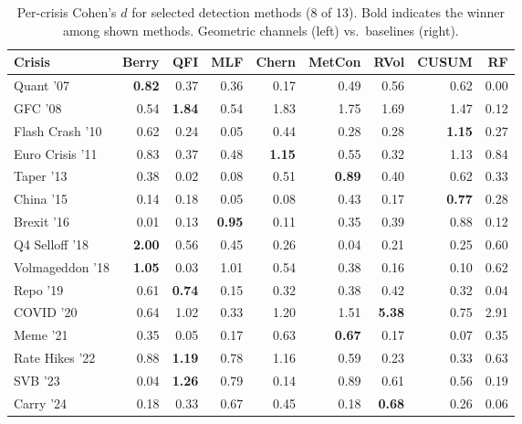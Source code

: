 \begin{table}[htbp]
\centering
\caption{Per-crisis Cohen's $d$ for selected detection methods (8 of 13).
  Bold indicates the winner among shown methods.  Geometric channels (left) vs.\ baselines (right).}
\label{tab:per_crisis_winners}
\footnotesize
\setlength{\tabcolsep}{3pt}
\begin{tabular}{lrrrrrrrr}
\toprule
Crisis & Berry & QFI & MLF & Chern & MetCon & RVol & CUSUM & RF \\
\midrule
Quant '07 & \textbf{0.82} & 0.37 & 0.36 & 0.17 & 0.49 & 0.56 & 0.62 & 0.00 \\
GFC '08 & 0.54 & \textbf{1.84} & 0.54 & 1.83 & 1.75 & 1.69 & 1.47 & 0.12 \\
Flash Crash '10 & 0.62 & 0.24 & 0.05 & 0.44 & 0.28 & 0.28 & \textbf{1.15} & 0.27 \\
Euro Crisis '11 & 0.83 & 0.37 & 0.48 & \textbf{1.15} & 0.55 & 0.32 & 1.13 & 0.84 \\
Taper '13 & 0.38 & 0.02 & 0.08 & 0.51 & \textbf{0.89} & 0.40 & 0.62 & 0.33 \\
China '15 & 0.14 & 0.18 & 0.05 & 0.08 & 0.43 & 0.17 & \textbf{0.77} & 0.28 \\
Brexit '16 & 0.01 & 0.13 & \textbf{0.95} & 0.11 & 0.35 & 0.39 & 0.88 & 0.12 \\
Q4 Selloff '18 & \textbf{2.00} & 0.56 & 0.45 & 0.26 & 0.04 & 0.21 & 0.25 & 0.60 \\
Volmageddon '18 & \textbf{1.05} & 0.03 & 1.01 & 0.54 & 0.38 & 0.16 & 0.10 & 0.62 \\
Repo '19 & 0.61 & \textbf{0.74} & 0.15 & 0.32 & 0.38 & 0.42 & 0.32 & 0.04 \\
COVID '20 & 0.64 & 1.02 & 0.33 & 1.20 & 1.51 & \textbf{5.38} & 0.75 & 2.91 \\
Meme '21 & 0.35 & 0.05 & 0.17 & 0.63 & \textbf{0.67} & 0.17 & 0.07 & 0.35 \\
Rate Hikes '22 & 0.88 & \textbf{1.19} & 0.78 & 1.16 & 0.59 & 0.23 & 0.33 & 0.63 \\
SVB '23 & 0.04 & \textbf{1.26} & 0.79 & 0.14 & 0.89 & 0.61 & 0.56 & 0.19 \\
Carry '24 & 0.18 & 0.33 & 0.67 & 0.45 & 0.18 & \textbf{0.68} & 0.26 & 0.06 \\
\bottomrule
\end{tabular}
\end{table}